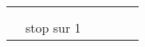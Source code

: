 \begin{tabular}{RC|C|C|CD}
	                                                                                                          \\
	                                                                                                          \\

	                    & stop sur 1                                                                                                                 \\
\end{tabular}
